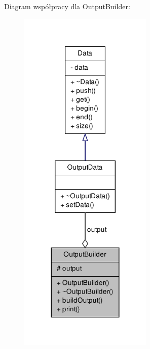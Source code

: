 \-Diagram współpracy dla \-Output\-Builder\-:\nopagebreak
\begin{figure}[H]
\begin{center}
\leavevmode
\includegraphics[width=180pt]{class_output_builder__coll__graph}
\end{center}
\end{figure}
